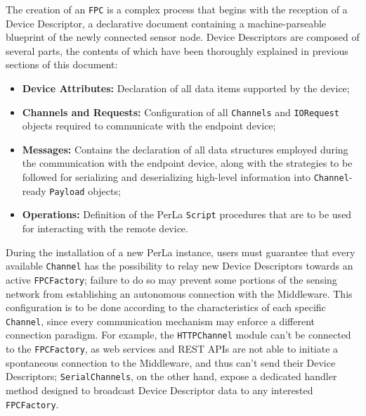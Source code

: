 The creation of an \texttt{FPC} is a complex process that begins with the
reception of a Device Descriptor, a declarative document containing a
machine-parseable blueprint of the newly connected sensor node. Device
Descriptors are composed of several parts, the contents of which have been
thoroughly explained in previous sections of this document: 

\begin{itemize}

    \item \textbf{Device Attributes:} Declaration of all data items supported
        by the device;

    \item \textbf{Channels and Requests:} Configuration of all
        \texttt{Channels} and \texttt{IORequest} objects required to
        communicate with the endpoint device;

    \item \textbf{Messages:} Contains the declaration of all data structures
        employed during the communication with the endpoint device, along with
        the strategies to be followed for serializing and deserializing
        high-level information into \texttt{Channel}-ready \texttt{Payload}
        objects;

    \item \textbf{Operations:} Definition of the PerLa \texttt{Script}
        procedures that are to be used for interacting with the remote device.
    
\end{itemize}

During the installation of a new PerLa instance, users must guarantee that
every available \texttt{Channel} has the possibility to relay new Device
Descriptors towards an active \texttt{FPCFactory}; failure to do so may prevent
some portions of the sensing network from establishing an autonomous connection
with the Middleware. This configuration is to be done according to the
characteristics of each specific \texttt{Channel}, since every communication
mechanism may enforce a different connection paradigm. For example, the
\texttt{HTTPChannel} module can't be connected to the \texttt{FPCFactory}, as
web services and REST APIs are not able to initiate a spontaneous connection to
the Middleware, and thus can't send their Device Descriptors;
\texttt{SerialChannels}, on the other hand, expose a dedicated handler method
designed to broadcast Device Descriptor data to any interested
\texttt{FPCFactory}.


